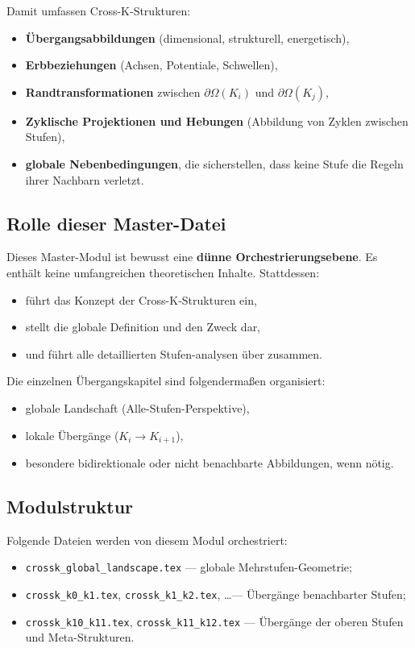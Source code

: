 Damit umfassen Cross-K-Strukturen:
\begin{itemize}
  \item \textbf{Übergangsabbildungen} (dimensional, strukturell, energetisch),
  \item \textbf{Erbbeziehungen} (Achsen, Potentiale, Schwellen),
  \item \textbf{Randtransformationen} zwischen $\partial\Omega(K_i)$ und
        $\partial\Omega(K_j)$,
  \item \textbf{Zyklische Projektionen und Hebungen} (Abbildung von Zyklen
        zwischen Stufen),
  \item \textbf{globale Nebenbedingungen}, die sicherstellen, dass keine Stufe
        die Regeln ihrer Nachbarn verletzt.
\end{itemize}

\subsection{Rolle dieser Master-Datei}
Dieses Master-Modul ist bewusst eine \textbf{dünne Orchestrierungsebene}.
Es enthält keine umfangreichen theoretischen Inhalte. Stattdessen:
\begin{itemize}
  \item führt das Konzept der Cross-K-Strukturen ein,
  \item stellt die globale Definition und den Zweck dar,
  \item und führt alle detaillierten Stufen-analysen über \verb|| zusammen.
\end{itemize}

Die einzelnen Übergangskapitel sind folgendermaßen organisiert:
\begin{itemize}
  \item globale Landschaft (Alle-Stufen-Perspektive),
  \item lokale Übergänge ($K_i \rightarrow K_{i+1}$),
  \item besondere bidirektionale oder nicht benachbarte Abbildungen, wenn nötig.
\end{itemize}

\subsection{Modulstruktur}
\noindent Folgende Dateien werden von diesem Modul orchestriert:
\begin{itemize}
  \item \verb|crossk_global_landscape.tex| — globale Mehrstufen-Geometrie;
  \item \verb|crossk_k0_k1.tex|, \verb|crossk_k1_k2.tex|, \dots — Übergänge
        benachbarter Stufen;
  \item \verb|crossk_k10_k11.tex|, \verb|crossk_k11_k12.tex| — Übergänge der
        oberen Stufen und Meta-Strukturen.
\end{itemize}

